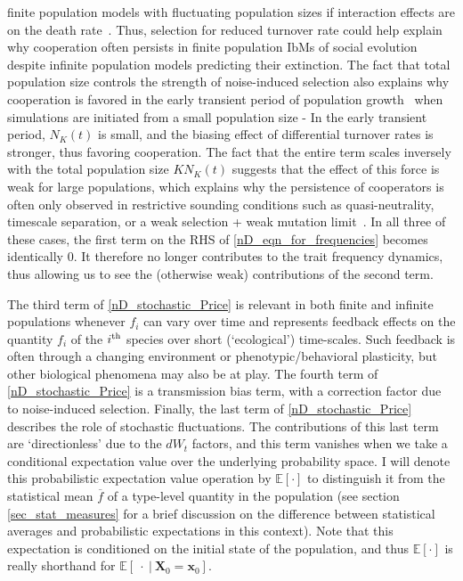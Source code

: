 finite population models with fluctuating population sizes if interaction effects are on the death rate~\citep{mcleod_social_2019}. Thus, selection for reduced turnover rate could help explain why cooperation often persists in finite population IbMs of social evolution~\citep{houchmandzadeh_selection_2012,houchmandzadeh_fluctuation_2015,chotibut_evolutionary_2015,behar_fluctuations-induced_2016,mcleod_social_2019} despite infinite population models predicting their extinction. The fact that total population size controls the strength of noise-induced selection also explains why cooperation is favored in the early transient period of population growth~\citep{melbinger_evolutionary_2010} when simulations are initiated from a small population size - In the early transient period, $N_K(t)$ is small, and the biasing effect of differential turnover rates is stronger, thus favoring cooperation. The fact that the entire term scales inversely with the total population size $KN_K(t)$ suggests that the effect of this force is weak for large populations, which explains why the persistence of cooperators is often only observed in restrictive sounding conditions such as quasi-neutrality, timescale separation, or a weak selection + weak mutation limit~\citep{mcleod_social_2019}. In all three of these cases, the first term on the RHS of \eqref{nD_eqn_for_frequencies} becomes identically 0. It therefore no longer contributes to the trait frequency dynamics, thus allowing us to see the (otherwise weak) contributions of the second term.

The third term of \eqref{nD_stochastic_Price} is relevant in both finite and infinite populations whenever $f_i$ can vary over time and represents feedback effects on the quantity $f_i$ of the $i\textsuperscript{th}$ species over short (`ecological') time-scales. Such feedback is often through a changing environment or phenotypic/behavioral plasticity, but other biological phenomena may also be at play. The fourth term of \eqref{nD_stochastic_Price} is a transmission bias term, with a correction factor due to noise-induced selection. Finally, the last term of \eqref{nD_stochastic_Price} describes the role of stochastic fluctuations. The contributions of this last term are `directionless' due to the $dW_t$ factors, and this term vanishes when we take a conditional expectation value over the underlying probability space. I will denote this probabilistic expectation value operation by $\mathbb{E}[\cdot]$ to distinguish it from the statistical mean $\overline{f}$ of a type-level quantity in the population (see section \ref{sec_stat_measures} for a brief discussion on the difference between statistical averages and probabilistic expectations in this context). Note that this expectation is conditioned on the initial state of the population, and thus $\mathbb{E}[\cdot]$ is really shorthand for $\mathbb{E}[\ \cdot \ | \ \mathbf{X}_0 = \mathbf{x}_0]$.

